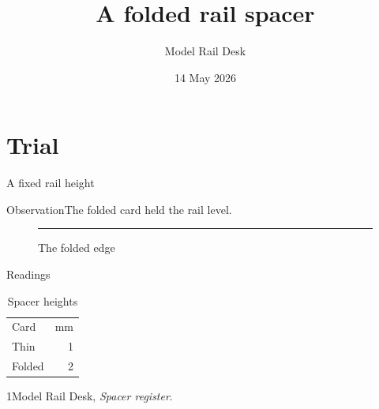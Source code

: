 \documentclass{beamer}
\title{A folded rail spacer}\author{Model Rail Desk}\institute{Paper Model Workshop}\date{14 May 2026}
\begin{document}
\frame{\titlepage}

\section{Trial}\begin{frame}{A fixed rail height}\begin{block}{Observation}The folded card held the rail level.\end{block}
\begin{figure}\rule{25mm}{2mm}\caption{The folded edge}\end{figure}\end{frame}
\begin{frame}{Readings}\begin{table}\begin{tabular}{lr}Card&mm\\Thin&1\\Folded&2\end{tabular}\caption{Spacer heights}\end{table}
\begin{thebibliography}{1}Model Rail Desk, \emph{Spacer register}.\end{thebibliography}\end{frame}
\end{document}
